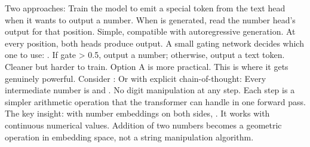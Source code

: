 {}
\markdownRendererSectionEnd \markdownRendererSectionBegin
{}\markdownRendererInterblockSeparator
{}Two approaches:\markdownRendererParagraphSeparator
{} Train the model to emit a special  token from the text head when it wants to output a number. When  is generated, read the number head's output for that position. Simple, compatible with autoregressive generation.\markdownRendererParagraphSeparator
{} At every position, both heads produce output. A small gating network decides which one to use: . If gate > 0.5, output a number; otherwise, output a text token. Cleaner but harder to train.\markdownRendererParagraphSeparator
{}Option A is more practical.\markdownRendererInterblockSeparator
{}
\markdownRendererSectionEnd \markdownRendererSectionBegin
{}\markdownRendererInterblockSeparator
{}This is where it gets genuinely powerful. Consider :\markdownRendererParagraphSeparator
{}\markdownRendererInterblockSeparator
{}\markdownRendererInterblockSeparator
{}\markdownRendererInterblockSeparator
{}\markdownRendererInterblockSeparator
{}Or with explicit chain-of-thought:\markdownRendererInterblockSeparator
{}\markdownRendererInterblockSeparator
{}Every intermediate number is  and . No digit manipulation at any step. Each step is a simpler arithmetic operation that the transformer can handle in one forward pass.\markdownRendererParagraphSeparator
{}The key insight: with number embeddings on both sides, . It works with continuous numerical values. Addition of two numbers becomes a geometric operation in embedding space, not a string manipulation algorithm.\markdownRendererInterblockSeparator
